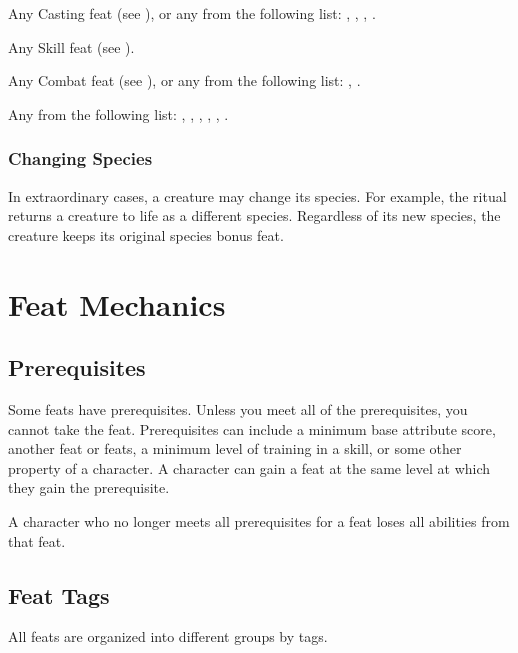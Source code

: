          Any Casting feat (see ), or any from the following list: , , , .

         Any Skill feat (see ).

         Any Combat feat (see ), or any from the following list: , .

         Any from the following list: , , , , , .

        \subsubsection{Changing Species}
            In extraordinary cases, a creature may change its species.
            For example, the  ritual returns a creature to life as a different species.
            Regardless of its new species, the creature keeps its original species bonus feat.

\section{Feat Mechanics}

    \subsection{Prerequisites}
        Some feats have prerequisites.
        Unless you meet all of the prerequisites, you cannot take the feat.
        Prerequisites can include a minimum base attribute score, another feat or feats, a minimum level of training in a skill, or some other property of a character.
        A character can gain a feat at the same level at which they gain the prerequisite.

        A character who no longer meets all prerequisites for a feat loses all abilities from that feat.

    \subsection{Feat Tags}
        All feats are organized into different groups by tags.

